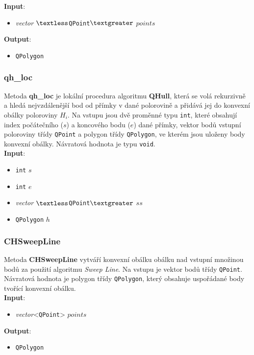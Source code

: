 \documentclass[a4paper, 12pt]{article}
\begin{document}
\textbf{Input}:
\begin{itemize}
\item \textsl{vector} $\textless$\texttt{QPoint}$\textgreater$ $points$
\end{itemize}

\textbf{Output}:
\begin{itemize}
\item \texttt{QPolygon}
\end{itemize}

\subsubsection{qh\_loc}
Metoda \textbf{qh\_loc} je lokální procedura algoritmu \textbf{QHull}, která se volá rekurzivně a hledá nejvzdálenější bod od přímky v dané polorovině a přidává jej do konvexní obálky poloroviny $H_i$. Na vstupu jsou dvě proměnné typu \texttt{int}, které obsahují index počátečního ($s$) a koncového bodu ($e$) dané přímky, vektor bodů vstupní poloroviny třídy \texttt{QPoint} a polygon třídy \texttt{QPolygon}, ve kterém jsou uloženy body konvexní obálky. Návratová hodnota je typu \texttt{void}.\\

\textbf{Input}:
\begin{itemize}
\item \texttt{int} $s$
\item \texttt{int} $e$
\item \textsl{vector} $\textless$\texttt{QPoint}$\textgreater$ $ss$
\item \texttt{QPolygon} $h$
\end{itemize}

\subsubsection{CHSweepLine}
Metoda \textbf{CHSweepLine} vytváří konvexní obálku obálku nad vstupní množinou bodů za použití algoritmu \textit{Sweep Line}. Na vstupu je vektor bodů třídy \texttt{QPoint}. Návratová hodnota je polygon třídy \texttt{QPolygon}, který obsahuje uspořádané body tvořící konvexní obálku.\\

\textbf{Input}:
\begin{itemize}
\item \textit{vector}<\texttt{QPoint}> $points$
\end{itemize}

\textbf{Output}:
\begin{itemize}
\item \texttt{QPolygon}
\end{itemize}
\end{document}
